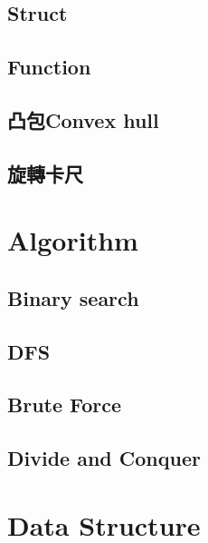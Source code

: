 \subsection{Struct}


\subsection{Function}


\subsection{凸包Convex hull}


\subsection{旋轉卡尺}


\section{Algorithm}

\subsection{Binary search}


\subsection{DFS}


\subsection{Brute Force}


\subsection{Divide and Conquer}


\newpage

\section{Data Structure}

